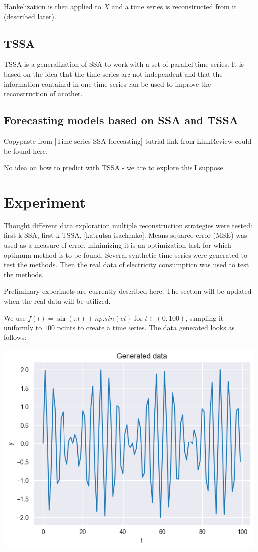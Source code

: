 \documentclass{article}
\begin{document}
Hankelization is then applied to \(X\) and a time series is reconstructed from it (described later).

\subsection{TSSA}

TSSA is a generalization of SSA to work with a set of parallel time series. It is based on the idea that the time series are not independent and that the information contained in one time series can be used to improve the reconstruction of another.

\subsection{Forecasting models based on SSA and TSSA}

Copypaste from [Time series SSA forecasting] tutrial link from LinkReview could be found here.

No idea on how to predict with TSSA - we are to explore this I suppose

\section{Experiment}

Thought different data exploration multiple reconstruction strategies were tested: first-k SSA, first-k TSSA, [katrutsa-isachenko]. Means squared error (MSE) was used as a measure of error, minimizing it is an optimization task for which optimum method is to be found. Several synthetic time series were generated to test the methods. Then the real data of electricity consumption was used to test the methods.

Preliminary experimets are currently described here. The section will be updated when the real data will be utilized.

We use \(f(t) = \sin(\pi t) + np.sin(et)\) for \(t \in (0, 100)\), sampling it uniformly to \(100\) points to create a time series. The data generated looks as follows:

\includegraphics[scale=0.7]{./images/fig1.png}
\end{document}
